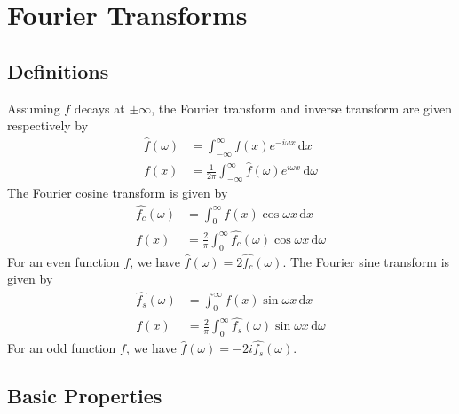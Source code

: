 \documentclass{article}
\begin{document}
\section{Fourier Transforms}

\subsection{Definitions}

Assuming $f$ decays at $\pm\infty$, the Fourier transform and inverse transform are given  respectively by
\begin{align*}
    \hat{f}(\omega) &= \int_{-\infty}^{\infty} f(x) e^{-i \omega x} \, \mathrm{d}x \\
    f(x) &= \frac{1}{2 \pi} \int_{-\infty}^{\infty} \hat{f}(\omega) e^{i \omega x} \, \mathrm{d}\omega
\end{align*}
The Fourier cosine transform is given by
\begin{align*}
    \hat{f_c}(\omega) &= \int_{0}^{\infty} f(x) \cos{\omega x} \, \mathrm{d}x \\
    f(x) &= \frac{2}{\pi} \int_{0}^{\infty} \hat{f_c}(\omega) \cos{\omega x} \, \mathrm{d}\omega
\end{align*}
For an even function $f$,  we have $\hat{f}(\omega) = 2 \hat{f_c}(\omega)$.
The Fourier sine transform is given by
\begin{align*}
    \hat{f_s}(\omega) &= \int_{0}^{\infty} f(x) \sin{\omega x} \, \mathrm{d}x \\
    f(x) &= \frac{2}{\pi} \int_{0}^{\infty} \hat{f_s}(\omega) \sin{\omega x} \, \mathrm{d}\omega
\end{align*}
For an odd function $f$,  we have $\hat{f}(\omega) = -2i \hat{f_s}(\omega)$.

\subsection{Basic Properties}
\end{document}
